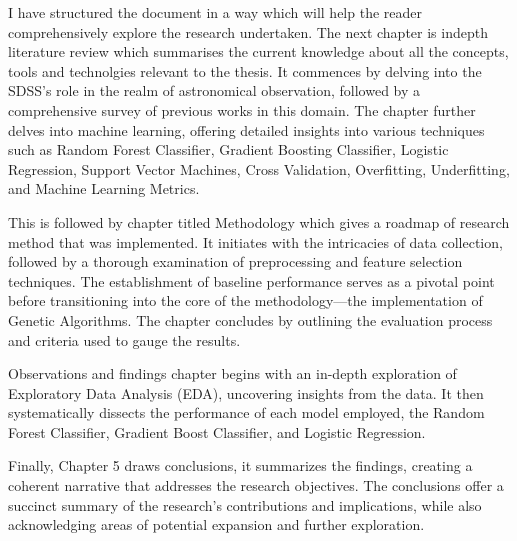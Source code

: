 I have structured the document in a way which will help the reader comprehensively explore the research undertaken. The next chapter is indepth literature review which summarises the current knowledge about all the concepts, tools and technolgies relevant to the thesis. It commences by delving into the SDSS's role in the realm of astronomical observation, followed by a comprehensive survey of previous works in this domain. The chapter further delves into machine learning, offering detailed insights into various techniques such as Random Forest Classifier, Gradient Boosting Classifier, Logistic Regression, Support Vector Machines, Cross Validation, Overfitting, Underfitting, and Machine Learning Metrics. 

This is followed by chapter titled Methodology which gives a roadmap of research method that was implemented. It initiates with the intricacies of data collection, followed by a thorough examination of preprocessing and feature selection techniques. The establishment of baseline performance serves as a pivotal point before transitioning into the core of the methodology—the implementation of Genetic Algorithms. The chapter concludes by outlining the evaluation process and criteria used to gauge the results.

Observations and findings chapter begins with an in-depth exploration of Exploratory Data Analysis (EDA), uncovering insights from the data. It then systematically dissects the performance of each model employed, the Random Forest Classifier, Gradient Boost Classifier, and Logistic Regression. 

Finally, Chapter 5 draws conclusions, it summarizes the findings, creating a coherent narrative that addresses the research objectives. The conclusions offer a succinct summary of the research's contributions and implications, while also acknowledging areas of potential expansion and further exploration.

